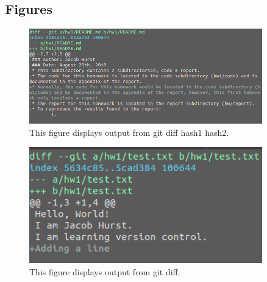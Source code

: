 \documentclass[12pt]{article}
\begin{document}
\subsection{Figures}
\begin{figure}[htb]
\begin{center}
\includegraphics[width=0.9\textwidth]{diff1.png}
   \caption{This figure displays output from git diff hash1 hash2.} 
    \label{fig:1}
\end{center}

\end{figure}
\begin{figure}[htb]
\begin{center}
\includegraphics[width=0.9\textwidth]{diff2.png}
   \caption{This figure displays output from git diff.} 
    \label{fig:2}
\end{center}
\end{figure}
\end{document}
